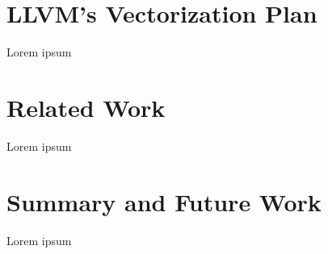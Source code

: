 \documentclass[sigplan,11pt,nonacm]{acmart}
\begin{document}
\section{LLVM's Vectorization Plan}
\label{sec:vplan}
Lorem ipsum




\section{Related Work}
\label{sec:relatedwork}
Lorem ipsum




\section{Summary and Future Work}
\label{sec:summary}
Lorem ipsum




\end{document}
